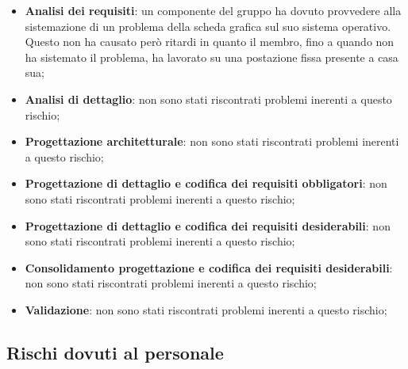 			\begin{itemize}
				\item \textbf{Analisi dei requisiti}: un componente del gruppo ha dovuto provvedere alla sistemazione di un problema della scheda grafica sul suo sistema operativo. \newline
				Questo non ha causato però ritardi in quanto il membro, fino a quando non ha sistemato il problema, ha lavorato su una postazione fissa presente a casa sua;
				\item \textbf{Analisi di dettaglio}: non sono stati riscontrati problemi inerenti a questo rischio;
				\item \textbf{Progettazione architetturale}: non sono stati riscontrati problemi inerenti a questo rischio;
				\item \textbf{Progettazione di dettaglio e codifica dei requisiti obbligatori}: non sono stati riscontrati problemi inerenti a questo rischio;
				\item \textbf{Progettazione di dettaglio e codifica dei requisiti desiderabili}: non sono stati riscontrati problemi inerenti a questo rischio;
				\item \textbf{Consolidamento progettazione e codifica dei requisiti desiderabili}: non sono stati riscontrati problemi inerenti a questo rischio;
				\item \textbf{Validazione}: non sono stati riscontrati problemi inerenti a questo rischio;
			\end{itemize}


	
	\subsection{Rischi dovuti al personale} %
	\label{sub:rischi_dovuti_al_personale}
